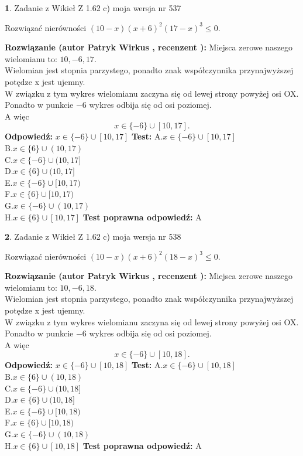 \documentclass[12pt, a4paper]{article}
\theoremstyle{definition} %
\newtheorem{zad}{}
\newcommand{\zadStart}[1]{\begin{zad}#1\newline}
\newcommand{\zadStop}{\end{zad}}
\newcommand{\rozwStart}[2]{\noindent \textbf{Rozwiązanie (autor #1 , recenzent #2): }\newline}
\newcommand{\rozwStop}{\newline}
\newcommand{\odpStart}{\noindent \textbf{Odpowiedź:}\newline}
\newcommand{\odpStop}{\newline}
\newcommand{\testStart}{\noindent \textbf{Test:}\newline}
\newcommand{\testStop}{\newline}
\newcommand{\kluczStart}{\noindent \textbf{Test poprawna odpowiedź:}\newline}
\newcommand{\kluczStop}{\newline}
\begin{document}
\zadStart{Zadanie z Wikieł Z 1.62 c) moja wersja nr 537}

Rozwiązać nierówności $(10-x)(x+6)^{2}(17-x)^{3}\le0$.
\zadStop
\rozwStart{Patryk Wirkus}{}
Miejsca zerowe naszego wielomianu to: $10, -6, 17$.\\
Wielomian jest stopnia parzystego, ponadto znak współczynnika przy\linebreak najwyższej potędze x jest ujemny.\\ W związku z tym wykres wielomianu zaczyna się od lewej strony powyżej osi OX.\\
Ponadto w punkcie $-6$ wykres odbija się od osi poziomej.\\
A więc $$x \in \{-6\} \cup [10,17].$$
\rozwStop
\odpStart
$x \in \{-6\} \cup [10,17]$
\odpStop
\testStart
A.$x \in \{-6\} \cup [10,17]$\\
B.$x \in \{6\} \cup (10,17)$\\
C.$x \in \{-6\} \cup (10,17]$\\
D.$x \in \{6\} \cup (10,17]$\\
E.$x \in \{-6\} \cup [10,17)$\\
F.$x \in \{6\} \cup [10,17)$\\
G.$x \in \{-6\} \cup (10,17)$\\
H.$x \in \{6\} \cup [10,17]$
\testStop
\kluczStart
A
\kluczStop



\zadStart{Zadanie z Wikieł Z 1.62 c) moja wersja nr 538}

Rozwiązać nierówności $(10-x)(x+6)^{2}(18-x)^{3}\le0$.
\zadStop
\rozwStart{Patryk Wirkus}{}
Miejsca zerowe naszego wielomianu to: $10, -6, 18$.\\
Wielomian jest stopnia parzystego, ponadto znak współczynnika przy\linebreak najwyższej potędze x jest ujemny.\\ W związku z tym wykres wielomianu zaczyna się od lewej strony powyżej osi OX.\\
Ponadto w punkcie $-6$ wykres odbija się od osi poziomej.\\
A więc $$x \in \{-6\} \cup [10,18].$$
\rozwStop
\odpStart
$x \in \{-6\} \cup [10,18]$
\odpStop
\testStart
A.$x \in \{-6\} \cup [10,18]$\\
B.$x \in \{6\} \cup (10,18)$\\
C.$x \in \{-6\} \cup (10,18]$\\
D.$x \in \{6\} \cup (10,18]$\\
E.$x \in \{-6\} \cup [10,18)$\\
F.$x \in \{6\} \cup [10,18)$\\
G.$x \in \{-6\} \cup (10,18)$\\
H.$x \in \{6\} \cup [10,18]$
\testStop
\kluczStart
A
\kluczStop
\end{document}
